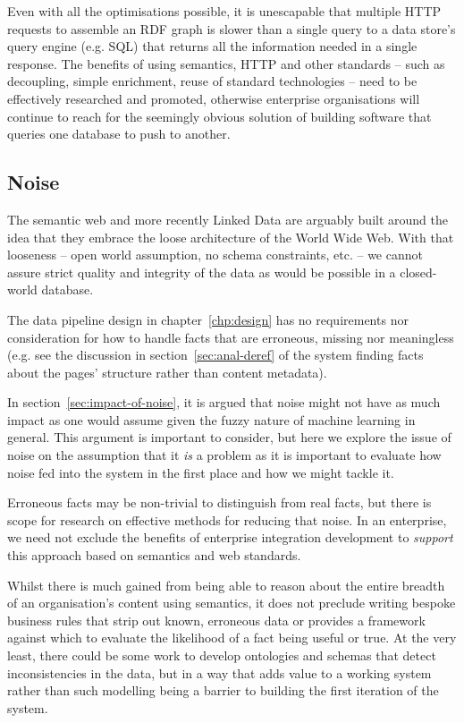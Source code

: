 Even with all the optimisations possible, it is unescapable that
multiple HTTP requests to assemble an RDF graph is slower than a
single query to a data store's query engine (e.g. SQL) that returns
all the information needed in a single response. The benefits of using
semantics, HTTP and other standards -- such as decoupling, simple
enrichment, reuse of standard technologies -- need to be effectively
researched and promoted, otherwise enterprise organisations will
continue to reach for the seemingly obvious solution of building
software that queries one database to push to another.

\subsection{Noise}

The semantic web and more recently Linked Data are arguably built
around the idea that they embrace the loose architecture of the
World Wide Web. With that looseness -- open world assumption,
no schema constraints, etc. -- we cannot assure strict quality and
integrity of the data as would be possible in a closed-world
database.

The data pipeline design in chapter~\ref{chp:design} has no
requirements nor consideration for how to handle facts that are
erroneous, missing nor meaningless (e.g. see the discussion
in section~\ref{sec:anal-deref} of the system finding facts about the
pages' structure rather than content metadata).

In section~\ref{sec:impact-of-noise}, it is argued that noise might
not have as much impact as one would assume given the fuzzy nature
of machine learning in general. This argument is important to consider,
but here we explore the issue of noise on the assumption that it
\emph{is} a problem as it is important to evaluate how noise fed into
the system in the first place and how we might tackle it.

Erroneous facts may be non-trivial to distinguish from real facts, but
there is scope for research on effective methods for reducing that
noise. In an enterprise, we need not exclude the benefits of
enterprise integration development to \emph{support} this approach
based on semantics and web standards.

Whilst there is much gained
from being able to reason about the entire breadth of an organisation's
content using semantics, it does not preclude writing bespoke business
rules that strip out known, erroneous data or provides a framework
against which to evaluate the likelihood of a fact being useful or
true. At the very least, there could be some work to develop ontologies
and schemas that detect inconsistencies in the data, but in a way
that adds value to a working system rather than such modelling being a
barrier to building the first iteration of the system.


